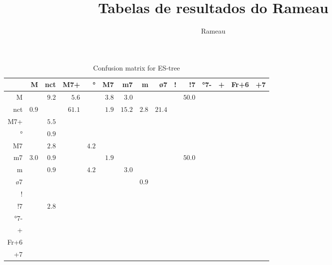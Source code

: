 \documentclass{article}
\title{Tabelas de resultados do Rameau}
\author{Rameau}
\begin{document}
\maketitle

\begin{table}
\begin{center}
\begin{tabular}{r|r|r|r|r|r|r|r|r|r|r|r|r|r|r}
       & M & nct & M7+ & ° & M7 & m7 & m & ø7 & ! & !7 & °7- & + & Fr+6 & +7 \\ \hline
 M & $ $ & $9.2$ & $5.6$ & $ $ & $3.8$ & $3.0$ & $ $ & $ $ & $ $ & $50.0$ & $ $ & $ $ & $ $ & $ $  \\ \hline
 nct & $0.9$ & $ $ & $61.1$ & $ $ & $1.9$ & $15.2$ & $2.8$ & $21.4$ & $ $ & $ $ & $ $ & $ $ & $ $ & $ $  \\ \hline
 M7+ & $ $ & $5.5$ & $ $ & $ $ & $ $ & $ $ & $ $ & $ $ & $ $ & $ $ & $ $ & $ $ & $ $ & $ $  \\ \hline
 ° & $ $ & $0.9$ & $ $ & $ $ & $ $ & $ $ & $ $ & $ $ & $ $ & $ $ & $ $ & $ $ & $ $ & $ $  \\ \hline
 M7 & $ $ & $2.8$ & $ $ & $4.2$ & $ $ & $ $ & $ $ & $ $ & $ $ & $ $ & $ $ & $ $ & $ $ & $ $  \\ \hline
 m7 & $3.0$ & $0.9$ & $ $ & $ $ & $1.9$ & $ $ & $ $ & $ $ & $ $ & $50.0$ & $ $ & $ $ & $ $ & $ $  \\ \hline
 m & $ $ & $0.9$ & $ $ & $4.2$ & $ $ & $3.0$ & $ $ & $ $ & $ $ & $ $ & $ $ & $ $ & $ $ & $ $  \\ \hline
 ø7 & $ $ & $ $ & $ $ & $ $ & $ $ & $ $ & $0.9$ & $ $ & $ $ & $ $ & $ $ & $ $ & $ $ & $ $  \\ \hline
 ! & $ $ & $ $ & $ $ & $ $ & $ $ & $ $ & $ $ & $ $ & $ $ & $ $ & $ $ & $ $ & $ $ & $ $  \\ \hline
 !7 & $ $ & $2.8$ & $ $ & $ $ & $ $ & $ $ & $ $ & $ $ & $ $ & $ $ & $ $ & $ $ & $ $ & $ $  \\ \hline
 °7- & $ $ & $ $ & $ $ & $ $ & $ $ & $ $ & $ $ & $ $ & $ $ & $ $ & $ $ & $ $ & $ $ & $ $  \\ \hline
 + & $ $ & $ $ & $ $ & $ $ & $ $ & $ $ & $ $ & $ $ & $ $ & $ $ & $ $ & $ $ & $ $ & $ $  \\ \hline
 Fr+6 & $ $ & $ $ & $ $ & $ $ & $ $ & $ $ & $ $ & $ $ & $ $ & $ $ & $ $ & $ $ & $ $ & $ $  \\ \hline
 +7 & $ $ & $ $ & $ $ & $ $ & $ $ & $ $ & $ $ & $ $ & $ $ & $ $ & $ $ & $ $ & $ $ & $ $  \\ \hline
\end{tabular}
\caption{Confusion matrix for ES-tree}
\end{center}
\end{table}
\end{document}
